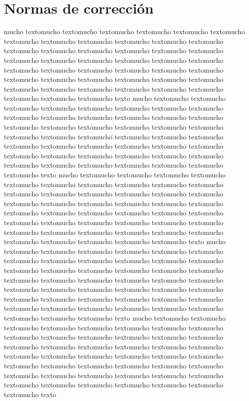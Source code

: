 \documentclass[11pt]{article}
\date{}
\title{}
\begin{document}
\tableofcontents

\setcounter{secnumdepth}{-1}
\section*{Normas de corrección}
\label{sec:org0000000}
mucho textomucho textomucho textomucho textomucho textomucho textomucho textomucho textomucho textomucho textomucho textomucho textomucho textomucho textomucho textomucho textomucho textomucho textomucho textomucho textomucho textomucho textomucho textomucho textomucho textomucho textomucho textomucho textomucho textomucho textomucho textomucho textomucho textomucho textomucho textomucho textomucho textomucho textomucho textomucho textomucho textomucho textomucho textomucho textomucho textomucho texto
mucho textomucho textomucho textomucho textomucho textomucho textomucho textomucho textomucho textomucho textomucho textomucho textomucho textomucho textomucho textomucho textomucho textomucho textomucho textomucho textomucho textomucho textomucho textomucho textomucho textomucho textomucho textomucho textomucho textomucho textomucho textomucho textomucho textomucho textomucho textomucho textomucho textomucho textomucho textomucho textomucho textomucho textomucho textomucho textomucho textomucho texto
mucho textomucho textomucho textomucho textomucho textomucho textomucho textomucho textomucho textomucho textomucho textomucho textomucho textomucho textomucho textomucho textomucho textomucho textomucho textomucho textomucho textomucho textomucho textomucho textomucho textomucho textomucho textomucho textomucho textomucho textomucho textomucho textomucho textomucho textomucho textomucho textomucho textomucho textomucho textomucho textomucho textomucho textomucho textomucho textomucho textomucho texto
mucho textomucho textomucho textomucho textomucho textomucho textomucho textomucho textomucho textomucho textomucho textomucho textomucho textomucho textomucho textomucho textomucho textomucho textomucho textomucho textomucho textomucho textomucho textomucho textomucho textomucho textomucho textomucho textomucho textomucho textomucho textomucho textomucho textomucho textomucho textomucho textomucho textomucho textomucho textomucho textomucho textomucho textomucho textomucho textomucho textomucho texto
mucho textomucho textomucho textomucho textomucho textomucho textomucho textomucho textomucho textomucho textomucho textomucho textomucho textomucho textomucho textomucho textomucho textomucho textomucho textomucho textomucho textomucho textomucho textomucho textomucho textomucho textomucho textomucho textomucho textomucho textomucho textomucho textomucho textomucho textomucho textomucho textomucho textomucho textomucho textomucho textomucho textomucho textomucho textomucho textomucho textomucho texto
\end{document}
